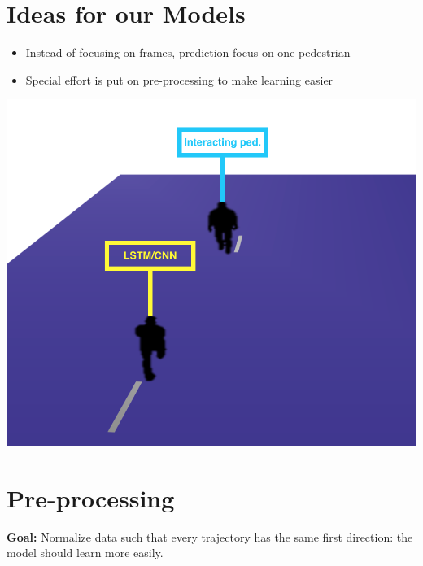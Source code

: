 \documentclass[a0,portrait]{a0poster}
\begin{document}
\begin{multicols}{2}
\section*{Ideas for our Models}
\begin{minipage}[]{0.6\linewidth}
\begin{itemize}
\justifying
\item Instead of focusing on frames, prediction focus on one pedestrian
\item Special effort is put on pre-processing to make learning easier
\end{itemize}
\end{minipage}
\hfill
\begin{minipage}[]{0.4\linewidth}
\centerline {\includegraphics[scale = 0.4]{figure/OurModel}}
\end{minipage}

\section*{Pre-processing}

\textbf{Goal:} Normalize data such that every trajectory has the same first direction: the model should learn more easily. \\


\end{multicols}
\end{document}
